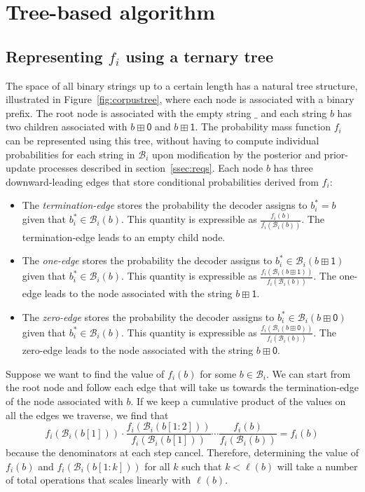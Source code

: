\documentclass{IEEEtran}
\begin{document}
\section{Tree-based algorithm}
\label{sec:tree}
\subsection{Representing $f_i$ using a ternary
tree}
\label{ssec:treerep}
The space of all binary strings up to a certain length has a natural tree
structure, illustrated in Figure~\ref{fig:corpustree}, where
each node is associated with a binary prefix. The
root node is associated with the empty string $\mathsf{\_}$ and
each string $b$ has two children associated with
$b\boxplus\mathsf{0}$ and $b\boxplus\mathsf{1}$. The probability
mass function $f_i$ can
be represented using this tree, without having to compute individual
probabilities for each string in $\mathcal{B}_i$ upon modification
by the posterior and prior-update processes described
in section~\ref{ssec:reqs}. Each node $b$ has
three downward-leading edges that store conditional probabilities
derived from $f_i$:
\begin{itemize}
	\item The \textit{termination-edge} stores the probability
		the decoder assigns to $b_i^*=b$ given that
		$b_i^* \in \mathcal{B}_i(b)$. This quantity
		is expressible as
		$\frac{f_i(b)}{f_i(\mathcal{B}_i(b))}$. The
		termination-edge leads to an empty child
		node.
	\item The \textit{one-edge} stores the probability
		the decoder assigns to $b_i^*
		\in\mathcal{B}_i(b\boxplus \mathsf{1})$ given that
		$b_i^* \in \mathcal{B}_i(b)$. This
		quantity is expressible as
		$\frac{f_i(\mathcal{B}_i(b\boxplus \mathsf{1}))}
		{f_i(\mathcal{B}_i(b))}$. The one-edge
		leads to the node associated with
		the string $b\boxplus \mathsf{1}$.
	\item The \textit{zero-edge} stores the probability
		the decoder assigns to $b_i^*
		\in\mathcal{B}_i(b\boxplus \mathsf{0})$ given that
		$b_i^* \in \mathcal{B}_i(b)$. This
		quantity is expressible as
		$\frac{f_i(\mathcal{B}_i(b\boxplus \mathsf{0}))}
		{f_i(\mathcal{B}_i(b))}$. The zero-edge
		leads to the node associated with
		the string $b\boxplus \mathsf{0}$.
\end{itemize}
Suppose we want to find the value of $f_i(b)$ for some
$b \in \mathcal{B}_i$. We can
start from the root node and follow each edge that will take us
towards the termination-edge of the node associated with $b$. 
If we keep a cumulative product of the values on all
the edges we traverse, we find that 
\begin{equation}
f_i(\mathcal{B}_i(b[1])) \cdot \frac{f_i(\mathcal{B}_i(b[1:2]))}
{f_i(\mathcal{B}_i(b[1]))} \cdots
\frac{f_i(b)}
{f_i(\mathcal{B}_i(b))}=f_i(b)
\end{equation}
because the denominators at each step cancel. Therefore, determining
the value of $f_i(b)$ and $f_i(\mathcal{B}_i(b[1:k]))$ for all $k$
such that $k < \ell(b)$ will take a number of total operations
that scales linearly with $\ell(b)$.
\end{document}
